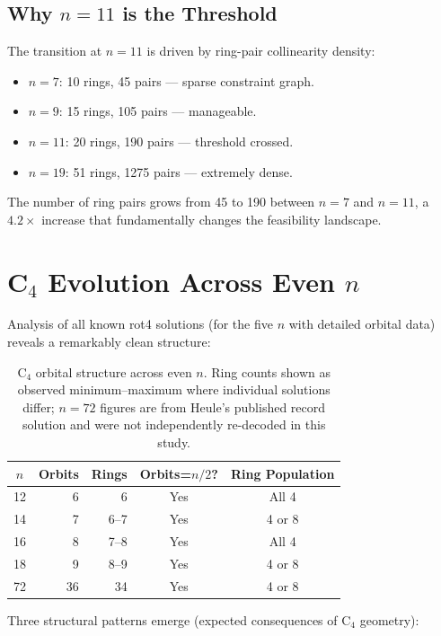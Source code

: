 \documentclass[11pt,a4paper]{article}
\theoremstyle{plain}
\theoremstyle{definition}
\begin{document}
\subsection{Why $n=11$ is the Threshold}

The transition at $n=11$ is driven by ring-pair collinearity density:
\begin{itemize}
\item $n=7$: 10 rings, 45 pairs --- sparse constraint graph.
\item $n=9$: 15 rings, 105 pairs --- manageable.
\item $n=11$: 20 rings, 190 pairs --- threshold crossed.
\item $n=19$: 51 rings, 1275 pairs --- extremely dense.
\end{itemize}

The number of ring pairs grows from 45 to 190 between $n=7$ and $n=11$, a $4.2\times$ increase that fundamentally changes the feasibility landscape.

\section{C$_4$ Evolution Across Even $n$}
\label{sec:c4evol}

Analysis of all known rot4 solutions (for the five $n$ with detailed orbital data) reveals a remarkably clean structure:

\begin{table}[H]
\centering
\caption{C$_4$ orbital structure across even $n$. Ring counts shown as observed minimum--maximum where individual solutions differ; $n=72$ figures are from Heule's published record solution and were not independently re-decoded in this study.}
\label{tab:c4evol}
\begin{tabular}{crrcc}
\toprule
$n$ & Orbits & Rings & Orbits=$n/2$? & Ring Population \\
\midrule
12 & 6 & 6 & Yes & All 4 \\
14 & 7 & 6--7 & Yes & 4 or 8 \\
16 & 8 & 7--8 & Yes & All 4 \\
18 & 9 & 8--9 & Yes & 4 or 8 \\
72 & 36 & 34 & Yes & 4 or 8 \\
\bottomrule
\end{tabular}
\end{table}

Three structural patterns emerge (expected consequences of C$_4$ geometry):
\end{document}
